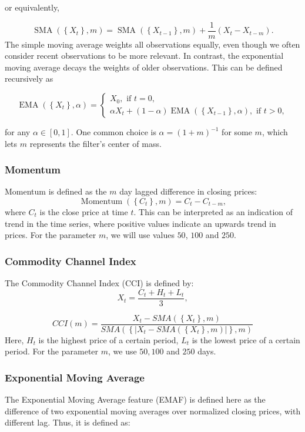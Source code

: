 \documentclass[twoside]{report}
\begin{document}
\begin{spacing}{1}
or equivalently,

\[
\operatorname{SMA}\left(\left\{X_{t}\right\}, m\right)=\operatorname{SMA}\left(\left\{X_{t-1}\right\}, m\right)+\frac{1}{m}\left(X_{t}-X_{t-m}\right).
\]
The simple moving average weights all observations equally, even though we often consider recent observations to be more relevant. In contrast, the exponential moving average decays the weights of older observations. This can be defined recursively as

\[
\operatorname{EMA}\left(\left\{X_{t}\right\}, \alpha\right)=\left\{\begin{array}{l}
X_{0}, \text { if } t=0, \\
\alpha X_{t}+(1-\alpha) \operatorname{EMA}\left(\left\{X_{t-1}\right\}, \alpha\right), \text { if } t>0,
\end{array}\right.
\]

for any $\alpha \in [0,1]$. One common choice is $\alpha = (1+m)^{-1}$ for some $m$, which lets $m$ represents the filter's center of mass.


\subsubsection{Momentum}
Momentum is defined as the $m$ day lagged difference in closing prices:
\[
\operatorname{Momentum}\left(\left\{C_{t}\right\}, m\right)=C_{t}-C_{t-m},
\]
where $C_t$ is the close price at time $t$. This can be interpreted as an indication of trend in the time series, where positive values indicate an upwards trend in prices. For the parameter $m$, we will use values $50$, $100$ and $250$.


\subsubsection{Commodity Channel Index}
The Commodity Channel Index (CCI) is defined by:
\[
X_{t}=\frac{C_{t}+H_{t}+L_{t}}{3},
\]

\[
C C I(m)=\frac{X_{t}-S M A\left(\left\{X_{t}\right\}, m\right)}{S M A\left(\left\{\left|X_{t}-S M A\left(\left\{X_{t}\right\}, m\right)\right|\right\}, m\right)}
\]
Here, $H_t$ is the highest price of a certain period, $L_t$ is the lowest price of a certain period.  For the parameter $m$, we use $50, 100$ and $250$ days.

\subsubsection{Exponential Moving Average}
The Exponential Moving Average feature (EMAF) is defined here as the
difference of two exponential moving averages over normalized closing prices,
with different lag. Thus, it is defined as:


\end{spacing}
\end{document}
